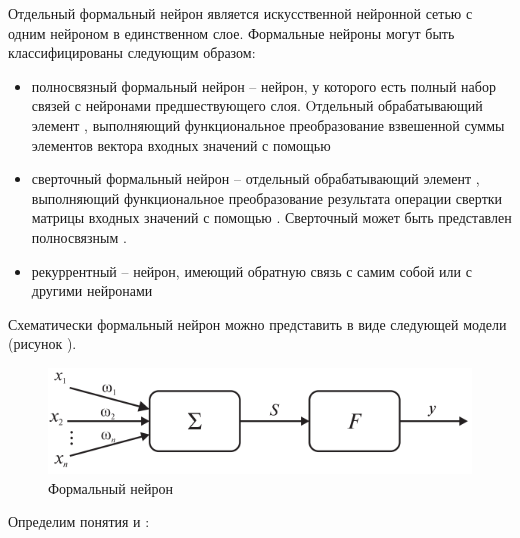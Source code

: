 Отдельный формальный нейрон является искусственной нейронной сетью с одним нейроном в единственном слое.
Формальные нейроны могут быть классифицированы следующим образом:
\begin{itemize}
	\item полносвязный формальный нейрон -- нейрон, у которого есть полный набор связей с нейронами предшествующего слоя. Oтдельный обрабатывающий элемент , выполняющий функциональное преобразование взвешенной суммы элементов вектора входных значений с помощью 
	\item сверточный формальный нейрон -- отдельный обрабатывающий элемент , выполняющий функциональное преобразование результата операции свертки матрицы входных значений с помощью . Сверточный  может быть представлен полносвязным .
	\item рекуррентный  -- нейрон, имеющий обратную связь с самим собой или с другими нейронами 
\end{itemize}

Схематически формальный нейрон можно представить в виде следующей модели (рисунок ).

\begin{figure}[H]
	\centering
	\includegraphics[scale=0.4]{author/part3/figures/formal_neuron.png}
	\caption{Формальный нейрон}
	\label{fig:formal_neuron}
\end{figure}

Определим понятия  и :

\begin{SCn}

\end{SCn}

